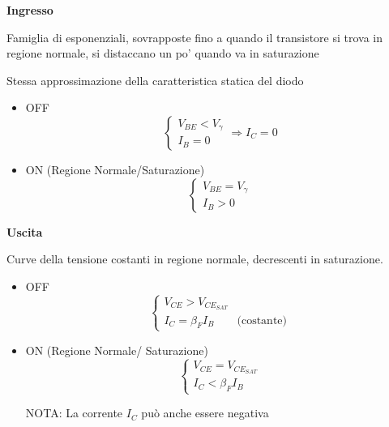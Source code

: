 \documentclass{article}
\begin{document}
\begin{minipage}[t]{0.47\textwidth}
    \begin{center}
        \textbf{Ingresso}
    \end{center}

    Famiglia di esponenziali, sovrapposte fino a quando il transistore si trova in regione normale, si distaccano un po' quando va in saturazione

    Stessa approssimazione della caratteristica statica del diodo

    \begin{itemize}
        \item OFF
            \[
                \begin{cases}
                    V_{BE} < V_\gamma\\
                    I_{B} = 0
                \end{cases}\Rightarrow I_C = 0
            \]
        \item ON (Regione Normale/Saturazione)
            \[
                \begin{cases}
                    V_{BE} = V_\gamma\\
                    I_B > 0
                \end{cases}
            \]
    \end{itemize}

\end{minipage}\quad
\begin{minipage}[t]{0.50\textwidth}
    \begin{center}
        \textbf{Uscita}
    \end{center}

    Curve della tensione costanti in regione normale, decrescenti in saturazione.
    \begin{itemize}
        \item OFF
            \[
                \begin{cases}
                    V_{CE} > V_{CE_{SAT}}\\
                    I_C = \beta_F I_B  \qquad \text{(costante)}
                \end{cases}
            \]
        \item ON (Regione Normale/ Saturazione)
            \[
                \begin{cases}
                    V_{CE} = V_{CE_{SAT}} \\
                    I_C < \beta_F I_B
                \end{cases}
            \]

            NOTA: La corrente $I_C$ può anche essere negativa
    \end{itemize}
\end{minipage}
\end{document}
